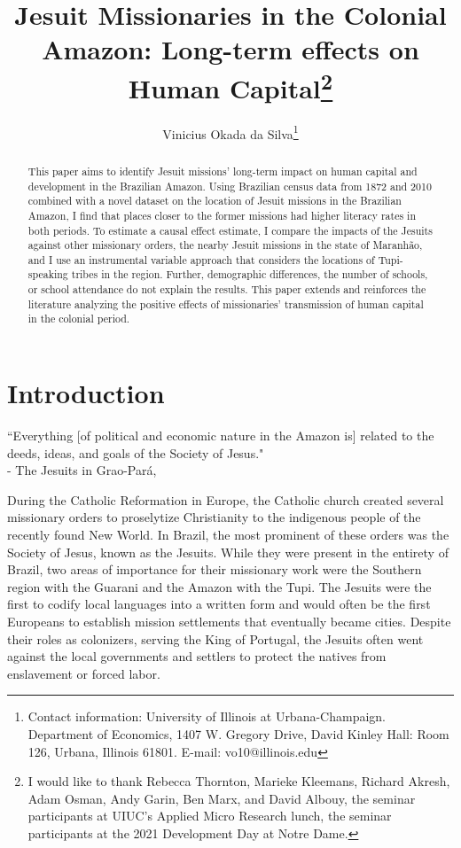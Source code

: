 \documentclass{article}
\title{Jesuit Missionaries in the Colonial Amazon: Long-term effects on Human Capital\thanks{I would like to thank Rebecca Thornton, Marieke Kleemans, Richard Akresh, Adam Osman, Andy Garin, Ben Marx, and David Albouy, the seminar participants at UIUC's Applied Micro Research lunch, the seminar participants at the 2021 Development Day at Notre Dame.}}
\author{Vinicius Okada da Silva\thanks{Contact information: University of Illinois at Urbana-Champaign. Department of Economics, 1407 W. Gregory Drive, David Kinley Hall: Room 126, Urbana, Illinois 61801. E-mail: vo10@illinois.edu}}
\affil{Department of Economics, University of Illinois at Urbana-Champaign}
\date{}
\begin{document}
\maketitle
\thispagestyle{empty} 

\begin{abstract}
This paper aims to identify Jesuit missions' long-term impact on human capital and development in the Brazilian Amazon. Using Brazilian census data from 1872 and 2010 combined with a novel dataset on the location of Jesuit missions in the Brazilian Amazon, I find that places closer to the former missions had higher literacy rates in both periods. To estimate a causal effect estimate, I compare the impacts of the Jesuits against other missionary orders, the nearby Jesuit missions in the state of Maranhão, and I use an instrumental variable approach that considers the locations of Tupi-speaking tribes in the region. Further, demographic differences, the number of schools, or school attendance do not explain the results. This paper extends and reinforces the literature analyzing the positive effects of missionaries' transmission of human capital in the colonial period.
\end{abstract}


\clearpage
{} 

\section{Introduction}

\begin{displayquote}
``Everything [of political and economic nature in the Amazon is] related to the deeds, ideas, and goals of the Society of Jesus."
\\ 
\smallskip
- The Jesuits in Grao-Pará, \textcite[p.~9]{Azevedo1930-ir}
\end{displayquote}

During the Catholic Reformation in Europe, the Catholic church created several missionary orders to proselytize Christianity to the indigenous people of the recently found New World. 
In Brazil, the most prominent of these orders was the Society of Jesus, known as the Jesuits. 
While they were present in the entirety of Brazil, two areas of importance for their missionary work were the Southern region with the Guarani and the Amazon with the Tupi. 
The Jesuits were the first to codify local languages into a written form and would often be the first Europeans to establish mission settlements that eventually became cities.
Despite their roles as colonizers, serving the King of Portugal, the Jesuits often went against the local governments and settlers to protect the natives from enslavement or forced labor.
\end{document}
